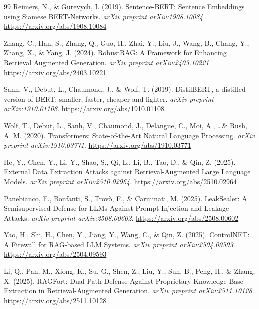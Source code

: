 \documentclass[12pt, a4paper]{article}
\theoremstyle{definition}
\theoremstyle{remark}
\begin{document}
\begin{thebibliography}{99}
Reimers, N., \& Gurevych, I. (2019). Sentence-BERT: Sentence Embeddings using Siamese BERT-Networks. \textit{arXiv preprint arXiv:1908.10084}.
\url{https://arxiv.org/abs/1908.10084}

Zhang, C., Han, S., Zhang, Q., Guo, H., Zhai, Y., Liu, J., Wang, B., Chang, Y., Zhang, X., \& Yang, J. (2024). RobustRAG: A Framework for Enhancing Retrieval Augmented Generation. \textit{arXiv preprint arXiv:2403.10221}.
\url{https://arxiv.org/abs/2403.10221}

Sanh, V., Debut, L., Chaumond, J., \& Wolf, T. (2019). DistilBERT, a distilled version of BERT: smaller, faster, cheaper and lighter. \textit{arXiv preprint arXiv:1910.01108}.
\url{https://arxiv.org/abs/1910.01108}

Wolf, T., Debut, L., Sanh, V., Chaumond, J., Delangue, C., Moi, A., \dots \& Rush, A. M. (2020). Transformers: State-of-the-Art Natural Language Processing. \textit{arXiv preprint arXiv:1910.03771}.
\url{https://arxiv.org/abs/1910.03771}

He, Y., Chen, Y., Li, Y., Shao, S., Qi, L., Li, B., Tao, D., \& Qin, Z. (2025). External Data Extraction Attacks against Retrieval-Augmented Large Language Models. \textit{arXiv preprint arXiv:2510.02964}.
\url{https://arxiv.org/abs/2510.02964}

Panebianco, F., Bonfanti, S., Trovò, F., \& Carminati, M. (2025). LeakSealer: A Semisupervised Defense for LLMs Against Prompt Injection and Leakage Attacks. \textit{arXiv preprint arXiv:2508.00602}.
\url{https://arxiv.org/abs/2508.00602}

Yao, H., Shi, H., Chen, Y., Jiang, Y., Wang, C., \& Qin, Z. (2025). ControlNET: A Firewall for RAG-based LLM Systems. \textit{arXiv preprint arXiv:2504.09593}.
\url{https://arxiv.org/abs/2504.09593}

Li, Q., Pan, M., Xiong, K., Su, G., Shen, Z., Liu, Y., Sun, B., Peng, H., \& Zhang, X. (2025). RAGFort: Dual-Path Defense Against Proprietary Knowledge Base Extraction in Retrieval-Augmented Generation. \textit{arXiv preprint arXiv:2511.10128}.
\url{https://arxiv.org/abs/2511.10128}

\end{thebibliography}
\end{document}
